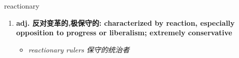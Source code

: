 
\begin{frame}
{\huge reactionary}
\begin{center}
\begin{enumerate}\Large
  \item \textbf{adj. 反对变革的,极保守的: characterized by reaction, especially opposition to progress or liberalism; extremely conservative}
  \begin{itemize}
    \item \em{\Large{reactionary rulers 保守的统治者}}
  \end{itemize}
\end{enumerate}
\end{center}
\end{frame}
